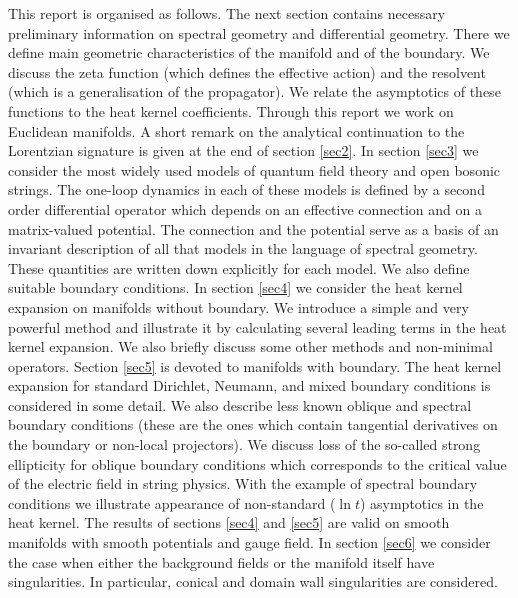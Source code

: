 This report is organised as follows. The next section contains
necessary preliminary information on spectral geometry and
differential geometry. There we define main geometric characteristics
of the manifold and of the boundary. We discuss the zeta function
(which defines the effective action) and the resolvent (which is
a generalisation of the propagator). We relate the asymptotics of these
functions to the heat kernel coefficients. Through this report we
work on Euclidean manifolds. A short remark on the
analytical continuation to the Lorentzian signature is given at the
end of section \ref{sec2}.
In  section \ref{sec3} we consider
the most widely used models of quantum field theory and open bosonic
strings. The one-loop dynamics in each of these models is defined by
a second order differential operator which depends on an effective
connection and on a matrix-valued potential. The connection and
the potential serve as a basis of an invariant description of all
that models in the language of spectral geometry. These quantities
are written down explicitly for each model. We also define suitable
boundary conditions. In section \ref{sec4} we consider the heat kernel
expansion on manifolds without boundary. We introduce a simple and
very powerful method and illustrate it by calculating several leading
terms in the heat kernel expansion. We also briefly discuss some other
methods and non-minimal operators. Section \ref{sec5} is devoted to 
manifolds with boundary. The heat kernel expansion for standard
Dirichlet, Neumann, and mixed boundary conditions is considered in some
detail. We also describe less known oblique and spectral boundary   
conditions (these are the ones which contain tangential derivatives
on the boundary or non-local projectors). We discuss loss of the
so-called strong ellipticity for oblique boundary conditions which
corresponds to the critical value of the electric field in string 
physics. With the example of spectral boundary conditions we
illustrate appearance of non-standard ($\ln t$) asymptotics in the
heat kernel. The results of sections \ref{sec4} and \ref{sec5}
are valid on smooth manifolds with smooth potentials and gauge field.
In section \ref{sec6} we consider the case when either the 
background fields or the manifold itself have singularities.
In particular, conical and domain wall singularities are considered.

